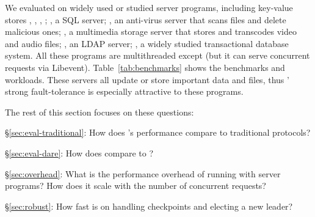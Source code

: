 We evaluated \xxx on \nprog widely used or studied server programs, including
\nkvprog key-value stores \redis, \memcached, \ssdb, \mongodb; \mysql, a SQL
server; \clamav, an anti-virus server that scans files and delete malicious ones;
\mediatomb, a multimedia storage server that stores and transcodes video and
audio files; \openldap, an LDAP server; \calvin, a widely studied transactional
database system. All these programs are multithreaded except \redis (but it can 
serve concurrent requests via Libevent). Table~\ref{tab:benchmarks} shows the 
benchmarks and workloads. These servers all update or store 
important data and files, thus \paxos' strong fault-tolerance is especially 
attractive to these programs. 






The rest of this section focuses on these questions:

\begin{tightenum}

\item[\S\ref{sec:eval-traditional}:] How does \xxx's performance compare
to traditional protocols?

\item[\S\ref{sec:eval-dare}:] How does \xxx compare
to \dare?

\item[\S\ref{sec:overhead}:] What is the performance overhead of running \xxx
with server programs? How does it scale with the number of concurrent 
requests?


\item[\S\ref{sec:robust}:] How fast is \xxx on handling checkpoints and
electing a new leader?



\end{tightenum}





